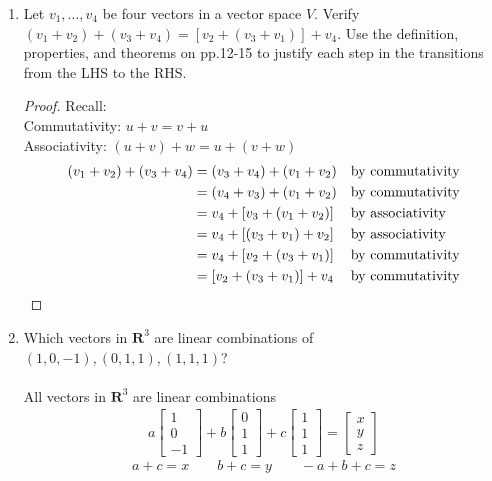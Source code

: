 \documentclass[12pt]{article}
\newcommand{\Rb}{\mathbf{R}}
\begin{document}
\begin{enumerate}
\begin{enumerate}
    \end{enumerate}\vspace{0.3in}
\item Let $v_1, \ldots, v_4$ be four vectors in a vector space $V$. Verify $(v_1 + v_2) +( v_3+v_4) = [v_2+(v_3+v_1)]+v_4$.  Use the definition, properties, and theorems on pp.12-15 to justify each step in the transitions from the LHS to the RHS.
\begin{proof}
    Recall:\\
    Commutativity: $u+v=v+u$ \\
    Associativity: $(u+v) + w = u + (v+w)$
    \begin{align}
        (v_1 + v_2) +( v_3+v_4) &= (v_3+v_4) + (v_1 + v_2) \notag && \text{by commutativity}
        \\&= (v_4+v_3) + (v_1 + v_2) \notag && \text{by commutativity}\\
        &= v_4 + [v_3 + (v_1 + v_2)] \notag && \text{by associativity}\\
        &= v_4 + [(v_3 + v_1 ) + v_2] \notag && \text{by associativity}\\
        &= v_4 + [v_2 + (v_3 + v_1 )] \notag && \text{by commutativity}\\
        &= [v_2 + (v_3 + v_1 )] + v_4 \notag && \text{by commutativity}\notag
    \end{align}
\end{proof}

\item Which vectors in $\mathbf{R}^3$ are linear combinations of $(1,0,-1), (0,1,1), (1,1,1)$?
\\\\All vectors in $\Rb^3$ are linear combinations
\begin{align}
    a \begin{bmatrix}
           1 \\
           0 \\
           -1
         \end{bmatrix}
          +b \begin{bmatrix}
           0 \\
           1 \\
           1
         \end{bmatrix}
        + c \begin{bmatrix}
           1 \\
           1 \\
           1
         \end{bmatrix}
        = \begin{bmatrix}
           x \\
           y \\
           z
         \end{bmatrix}
  \end{align}
  $$a + c = x \qquad b + c = y \qquad -a + b + c = z$$


\end{enumerate}
\end{document}
